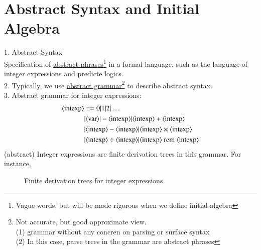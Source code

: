 \documentclass{report}[12pt]
\begin{document}
\section{Abstract Syntax and Initial Algebra}
1. Abstract Syntax \\
Specification of \underline{abstract phrases}\footnote{Vague words, but will be made rigorous when we define initial algebra} in a formal language, such as the language of integer expressions and predicte logics. \\
2. Typically, we use \underline{abstract grammar}\footnote{Not accurate, but good approximate view. \\(1) grammar without any concren on parsing or surface syntax \\(2) In this case, parse trees in the grammar are abstract phrases} to describe abstract syntax. \\
3. Abstract grammar for integer expressions: \\
\begin{align*}
    \langle \text{intexp}\rangle&::=0 | 1 | 2 | \ldots \\
    &| \langle \text{var}\rangle | -\langle \text{intexp}\rangle | \langle \text{intexp}\rangle + \langle \text{intexp}\rangle \\
    &| \langle \text{intexp}\rangle - \langle \text{intexp}\rangle | \langle \text{intexp}\rangle \times \langle \text{intexp}\rangle \\
    &| \langle \text{intexp}\rangle \div \langle \text{intexp}\rangle | \langle \text{intexp}\rangle \text{ rem } \langle \text{intexp}\rangle
\end{align*}
(abstract) Integer expressions are finite derivation trees in this grammar. For instance, \\
\begin{figure}
    \caption{Finite derivation trees for integer expressions}
\end{figure}
\end{document}
